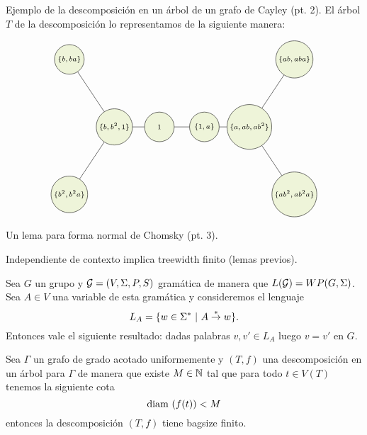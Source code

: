 \documentclass[aspectratio=169, 11pt]{beamer}
\begin{document}
	\begin{frame}[fragile]{Ejemplo de la descomposición en un árbol de un grafo de Cayley (pt. 2).}
		El árbol $T$ de la descomposición lo representamos de la siguiente manera:

	\[
			\begin{tikzpicture}[scale=0.8, V/.style = {circle, draw,align= center, minimum size=0.5cm,
			minimum size=3em,inner sep=2,
			fill=applegreen!15,font=\scriptsize	},fill fraction/.style={path picture={
				\fill[#1] 
				(path picture bounding box.south) rectangle
				(path picture bounding box.north west);
		}},
		fill fraction/.default=gray!50
		]
		\node[align=center] at (2, -6) {};
		\begin{scope}[nodes=V,xshift=4.5cm, yshift=-4cm]
			\node (1) at (0,0)  {$\{ b,b^2,1 \}$};
			\node (2) at (2,0)  {$1$};
			\node (3) at (4,0)  {$\{ 1,a \}$};
			\node (4) at (-2,3)     {$\{ b,ba \}$};
			\node (5) at (-2,-3)   {$\{b^2,b^2a\}$};
			\node (6) at (6,0)  {$\{ a,ab,ab^2 \}$};
			
			\node (9) at (8,3)  {$\{ab,aba\}$};
			\node (10) at (8,-3)  {$\{ ab^2, ab^2a \}$};
		\end{scope}
		
		
		\draw (1) edge[-] (2);
		\draw (2) edge[-] (3);
		\draw (1) edge[-] (5);
		\draw (1) edge[-] (4);
		\draw (3) edge[-] (6);
		\draw (6) edge[-] (9);
		\draw (6) edge[-] (10);
	\end{tikzpicture}
	\]
	\end{frame}

	\begin{frame}[fragile]{Un lema para forma normal de Chomsky (pt. 3).}
		
		\TODO{}
	\end{frame}
	
	\begin{frame}[fragile]{Independiente de contexto implica treewidth finito (lemas previos).}
		\begin{lema}[1]
			Sea $G$ un grupo \ic{} y ${\cal G} = (V, \Sigma, P, S)$ gramática \ic{}  de manera que $L({\cal G}) = WP(G,\Sigma)$.
			Sea $A \in V$ una variable de esta gramática y consideremos el lenguaje
			\[
			L_A = \{ w \in \Sigma^*  \ | \ A \overset{*}{\to} w  \}.
			\]
			Entonces vale el siguiente resultado:
			dadas palabras $v,v' \in L_{A}$ luego $v = v'$ en $G$.
		\end{lema}

		\begin{lema}[2]
			Sea $\Gamma$ un grafo de grado acotado uniformemente y 
			$(T,f)$ una descomposición en un árbol para $\Gamma$ de manera que existe $M \in \mathbb{N}$ tal que para todo $t \in V(T)$ tenemos la siguiente cota
			\[
				  \text{diam}\ (f(t)) < M
			\]   
			entonces la descomposición $(T,f)$ tiene bagsize finito.
		\end{lema}
	\end{frame}
\end{document}

